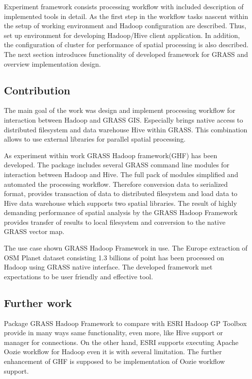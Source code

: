 \documentclass[a4paper,12pt,oneside]{report}
\begin{document}
	Experiment framework consists processing workflow with included description of 
	implemented tools in detail. As the first step in the workflow tasks nascent 
	within the setup of working environment and Hadoop configuration are described. Thus, 
	set up environment for developing Hadoop/Hive client application. In addition, 
	the configuration of  cluster for performance of spatial processing is also described.
	The next section introduces functionality of developed framework for GRASS and overview 
	implementation design.  
	
	\subsection*{Contribution}
	The main goal of the work was design and implement processing workflow for
	interaction  between  Hadoop and GRASS GIS. Especially brings native access to
	distributed filesystem and data warehouse Hive within GRASS. This combination
	allows to use external libraries for parallel spatial processing. 
	
	As experiment within work GRASS Hadoop framework(GHF) has been developed.
	The package includes several GRASS command line modules for interaction between
	Hadoop and Hive. The full pack of modules simplified and automated the
	processing workflow. Therefore conversion data to serialized format, provides
	transaction of data to distributed filesystem and load data to Hive data
	warehouse which supports two spatial libraries. The result of highly demanding 
	performance of spatial analysis by the GRASS Hadoop Framework provides transfer of
	results to local filesystem and conversion to the native GRASS vector map. 
	
	The use case shown GRASS Hadoop Framework in use. The Europe extraction of OSM Planet dataset consisting 1.3 billions of point
	 has been processed on Hadoop using GRASS native interface. The developed framework
	 met expectations to be user friendly and effective tool.
	
	\subsection*{Further work}
	Package GRASS Hadoop Framework to compare with ESRI Hadoop GP Toolbox
	provide in many ways same functionality, even more, like Hive support or manager for connections. On the other hand, ESRI supports executing Apache Oozie workflow for Hadoop even  it is with several limitation. The further enhancement of GHF is supposed to be implementation of Oozie workflow support.
	
\end{document}
